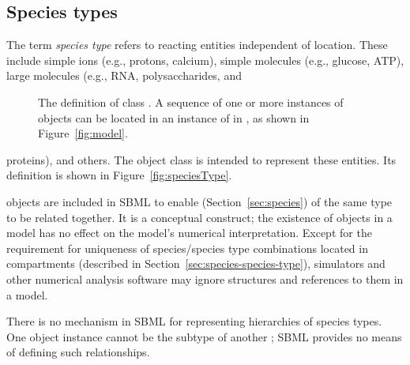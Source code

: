 \subsection{Species types}
\label{sec:speciesType}

The term \emph{species type} refers to reacting entities
independent of location.  These include simple ions (e.g.,
protons, calcium), simple molecules (e.g., glucose, ATP), large
molecules (e.g., RNA, polysaccharides, and
\begin{figure}
  \centering
  \small
  \caption{The definition of class \SpeciesType.  A
      sequence of one or more instances of \SpeciesType objects
      can be located in an instance of \ListOfSpeciesTypes in
      \Model, as shown in Figure~\protect\ref{fig:model}.}
  \label{fig:speciesType}
\end{figure}
proteins), and others.  The \SpeciesType object class is
intended to represent these entities.  Its definition is shown in
Figure~\vref{fig:speciesType}.

\SpeciesType objects are included in SBML to enable \Species
(Section~\ref{sec:species}) of the same type to be related
together.  It is a conceptual construct; the existence of
\SpeciesType objects in a model has no effect on the model's
numerical interpretation.  Except for the requirement for
uniqueness of species/species type combinations located in
compartments (described in
Section~\ref{sec:species-species-type}), simulators and other
numerical analysis software may ignore \SpeciesType structures and
references to them in a model.

There is no mechanism in SBML for representing hierarchies of
species types.  One \SpeciesType object instance cannot be the subtype
of another \SpeciesType; SBML provides no means of
defining such relationships.


